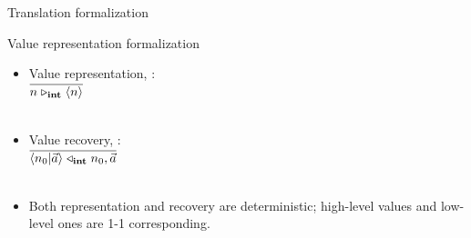 \documentclass{beamer}
\newtheorem{thm}{Theorem}
\newtheorem{lem}[thm]{Lemma}
\newtheorem{cor}[thm]{Corollary}
\begin{document}
\begin{frame}{Translation formalization}
\begin{itemize}
\end{itemize}
\end{frame}


\begin{frame}{Value representation formalization}
\begin{itemize}
	\item Value representation,  : \\[2ex]
	$\overline{n \mathrel{\triangleright_{\mathbf{int}}} \langle n \rangle}$ \\
	\\[2ex]
	
	\item Value recovery,  : \\[2ex]
	
	$\ol{\Vtransb{\etail{n_0}{\a}}{\int}{n_0}{\a}}$ \\[3ex] 
\\

\item Both representation and recovery are deterministic; high-level values and low-level ones are 1-1 corresponding. 

\end{itemize}

%
%
%
%

\end{frame}
 
\end{document}
